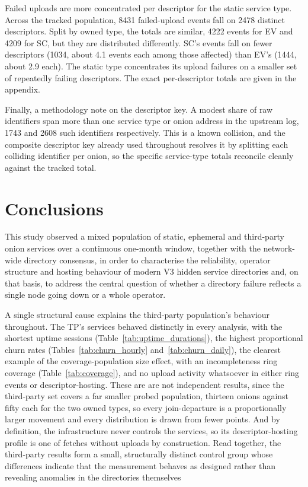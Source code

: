 \documentclass[conference]{IEEEtran}
\begin{document}
Failed uploads are more concentrated per descriptor for the static service type. Across the tracked population, 8431 failed-upload events fall on 2478 distinct 
descriptors. Split by owned type, the totals are similar, 4222 events for EV and 4209 for SC, but they are distributed differently. SC's events fall on fewer 
descriptors (1034, about 4.1 events each among those affected) than EV's (1444, about 2.9 each). The static type concentrates its upload failures on a smaller 
set of repeatedly failing descriptors. The exact per-descriptor totals are given in the appendix.
 
Finally, a methodology note on the descriptor key. A modest share of raw identifiers span more than one service type or onion address in the upstream 
log, 1743 and 2608 such identifiers respectively. This is a known collision, and the composite descriptor key already used throughout
resolves it by splitting each colliding identifier per onion, so the specific service-type totals reconcile cleanly against the tracked total. %

\section{Conclusions}
 
This study observed a mixed population of static, ephemeral and third-party onion services over a continuous one-month window, together with the network-wide 
directory consensus, in order to characterise the reliability, operator structure and hosting behaviour of modern V3 hidden service directories and, on that 
basis, to address the central question of whether a directory failure reflects a single node going down or a whole operator.

A single structural cause explains the third-party population's behaviour throughout. The TP's services behaved distinctly in every 
analysis, with the shortest uptime sessions (Table~\ref{tab:uptime_durations}), the highest proportional churn rates (Tables~\ref{tab:churn_hourly} and~\ref{tab:churn_daily}), 
the clearest example of the coverage-population size effect, with an incompleteness ring coverage (Table~\ref{tab:coverage}), 
and no upload activity whatsoever in either ring events or descriptor-hosting. These are are not independent results, 
since the third-party set covers a far smaller probed population, thirteen onions against fifty each for the two owned 
types, so every join-departure is a proportionally larger movement and every distribution is drawn from fewer points. And by definition, the infrastructure never 
controls the services, so its descriptor-hosting profile is one of fetches without uploads by construction. Read together, the third-party results form a small, 
structurally distinct control group whose differences indicate that the measurement behaves as designed rather than revealing anomalies in the directories themselves
\end{document}
